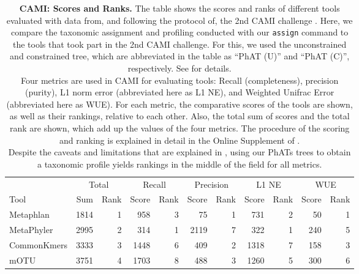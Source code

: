 \begin{table}[htb]
\caption[CAMI: Scores and Ranks]{
\textbf{CAMI: Scores and Ranks.}
The table shows the scores and ranks of different tools evaluated with data from, and following the protocol of,
the 2nd CAMI challenge \citep{Sczyrba2017,Bremges2018}.
Here, we compare the taxonomic assignment and profiling conducted with our \texttt{assign} command
to the tools that took part in the 2nd CAMI challenge.
For this, we used the unconstrained and constrained  tree,
which are abbreviated in the table as ``PhAT (U)'' and ``PhAT (C)'', respectively.
See  for details.
\\
Four metrics are used in CAMI for evaluating tools:
Recall (completeness), precision (purity), L1 norm error (abbreviated here as L1 NE),
and Weighted Unifrac Error (abbreviated here as WUE).
For each metric, the comparative scores of the tools are shown, as well as their rankings, relative to each other.
Also, the total sum of scores and the total rank are shown, which add up the values of the four metrics.
The procedure of the scoring and ranking is explained in detail in the Online Supplement of \cite{Sczyrba2017}.
\\
Despite the caveats and limitations that are explained in ,
using our \acp{PhAT} trees to obtain a taxonomic profile yields rankings in the middle of the field for all metrics.
}
\label{tab:cami_rankings}
{
    \begin{center}
    \begin{tabular}{lrrrrrrrrrr}
        \toprule
                       & \multicolumn{2}{c}{Total} & \multicolumn{2}{c}{Recall} & \multicolumn{2}{c}{Precision} & \multicolumn{2}{c}{L1 NE} & \multicolumn{2}{c}{WUE} \\
        Tool           & Sum & Rank & Score & Rank & Score & Rank & Score & Rank & Score & Rank \\
        \midrule
        Metaphlan           &   1814    &   1   &   958     &   3   &  75       &   1   &  731      &   2   & 50    &   1   \\
        MetaPhyler          &   2995    &   2   &   314     &   1   &  2119     &   7   &  322      &   1   & 240   &   5   \\
        CommonKmers         &   3333    &   3   &   1448    &   6   &  409      &   2   &  1318     &   7   & 158   &   3   \\
        mOTU                &   3751    &   4   &   1703    &   8   &  488      &   3   &  1260     &   5   & 300   &   6   \\

\end{tabular}
\end{center}}
\end{table}
